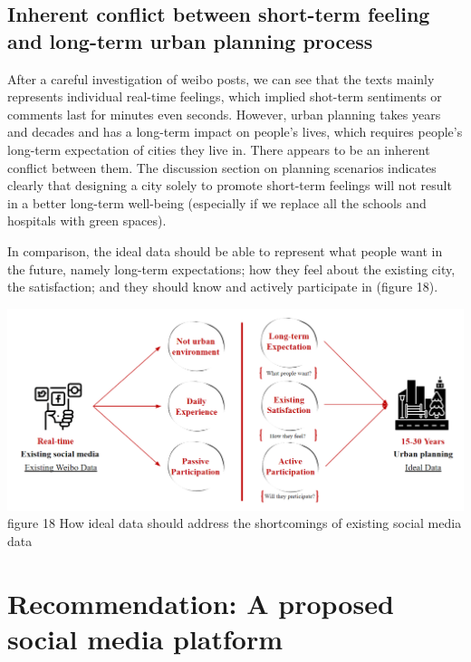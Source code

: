 \documentclass[
]{article}
\begin{document}
\hypertarget{inherent-conflict-between-short-term-feeling-and-long-term-urban-planning-process}{%
\subsection{Inherent conflict between short-term feeling and long-term
urban planning
process}\label{inherent-conflict-between-short-term-feeling-and-long-term-urban-planning-process}}

After a careful investigation of weibo posts, we can see that the texts
mainly represents individual real-time feelings, which implied shot-term
sentiments or comments last for minutes even seconds. However, urban
planning takes years and decades and has a long-term impact on people's
lives, which requires people's long-term expectation of cities they live
in. There appears to be an inherent conflict between them. The
discussion section on planning scenarios indicates clearly that
designing a city solely to promote short-term feelings will not result
in a better long-term well-being (especially if we replace all the
schools and hospitals with green spaces).

In comparison, the ideal data should be able to represent what people
want in the future, namely long-term expectations; how they feel about
the existing city, the satisfaction; and they should know and actively
participate in (figure 18).

\href{https://WTHSYZW.github.io/Thesis_2022/maps/comparison2.png}{\includegraphics{maps/comparison2.png}}
figure 18 How ideal data should address the shortcomings of existing
social media data

\hypertarget{recommendation-a-proposed-social-media-platform}{%
\section{Recommendation: A proposed social media
platform}\label{recommendation-a-proposed-social-media-platform}}
\end{document}
